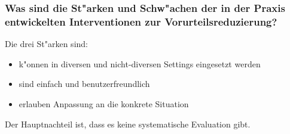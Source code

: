 \subsubsection{Was sind die St"arken und Schw"achen der in der Praxis entwickelten Interventionen zur Vorurteilsreduzierung?}
Die drei St"arken sind:
\begin{itemize}
        \item k"onnen in diversen und nicht-diversen Settings eingesetzt werden
        \item sind einfach und benutzerfreundlich
        \item erlauben Anpassung an die konkrete Situation
\end{itemize}

\noindent Der Hauptnachteil ist, dass es keine systematische Evaluation gibt.
